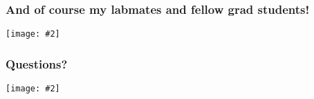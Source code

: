 \documentclass{beamer}
\newcommand{\slidefigure}[2][1]{\centering\texttt{[image: \#2]}}
\begin{document}
\begin{frame}
	\frametitle{And of course my labmates and fellow grad students!}
	\slidefigure{labmates}
\end{frame}

\begin{frame}
	\frametitle{Questions?}
	\slidefigure{questions}
\end{frame}




\end{document}
